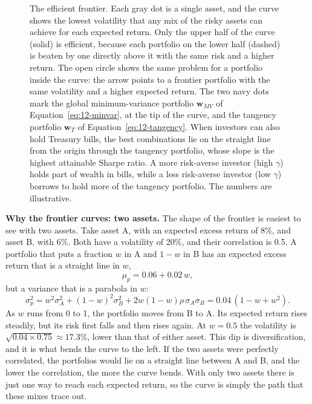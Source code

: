 \begin{figure}[htbp]
{%
}
\caption{The efficient frontier. Each gray dot is a single asset, and the curve shows the lowest volatility that any mix of the risky assets can achieve for each expected return. Only the upper half of the curve (solid) is efficient, because each portfolio on the lower half (dashed) is beaten by one directly above it with the same risk and a higher return. The open circle shows the same problem for a portfolio inside the curve: the arrow points to a frontier portfolio with the same volatility and a higher expected return. The two navy dots mark the global minimum-variance portfolio $\mathbf{w}_{MV}$ of Equation~\eqref{eq:12-minvar}, at the tip of the curve, and the tangency portfolio $\mathbf{w}_T$ of Equation~\eqref{eq:12-tangency}. When investors can also hold Treasury bills, the best combinations lie on the straight line from the origin through the tangency portfolio, whose slope is the highest attainable Sharpe ratio. A more risk-averse investor (high $\gamma$) holds part of wealth in bills, while a less risk-averse investor (low $\gamma$) borrows to hold more of the tangency portfolio. The numbers are illustrative.}
\label{fig:12-frontier}
\end{figure}

\textbf{Why the frontier curves: two assets.}\label{sec:12-frontier-derivation} The shape of the frontier is easiest to see with two assets. Take asset A, with an expected excess return of 8\%, and asset B, with 6\%. Both have a volatility of 20\%, and their correlation is 0.5. A portfolio that puts a fraction $w$ in A and $1 - w$ in B has an expected excess return that is a straight line in $w$,
\begin{equation}
  \mu_p = 0.06 + 0.02\,w,
  \label{eq:12-two-mean}
\end{equation}
but a variance that is a parabola in $w$:
\begin{equation}
  \sigma_p^2 = w^2\sigma_A^2 + (1-w)^2\sigma_B^2 + 2w(1-w)\rho\,\sigma_A\sigma_B = 0.04\,(1 - w + w^2).
  \label{eq:12-two-var}
\end{equation}
As $w$ runs from 0 to 1, the portfolio moves from B to A. Its expected return rises steadily, but its risk first falls and then rises again. At $w = 0.5$ the volatility is $\sqrt{0.04 \times 0.75} \approx 17.3\%$, lower than that of either asset. This dip is diversification, and it is what bends the curve to the left. If the two assets were perfectly correlated, the portfolios would lie on a straight line between A and B, and the lower the correlation, the more the curve bends. With only two assets there is just one way to reach each expected return, so the curve is simply the path that these mixes trace out.

